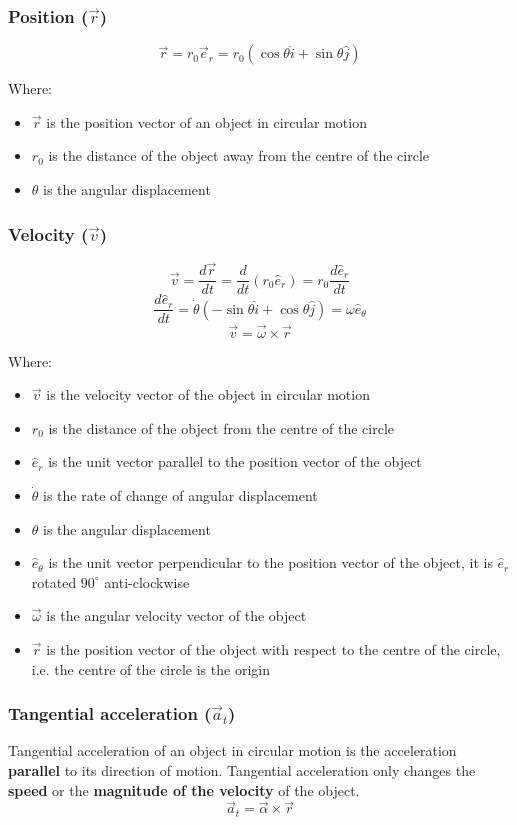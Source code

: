 \documentclass[11pt]{article}
\begin{document}
\subsubsection{Position (\(\vec{r}\))}
\label{sec:orge76ac7c}
\[\vec{r} = r_0 \vec{e}_r = r_0 (\cos \theta \hat{i} + \sin \theta \hat{j})\]

Where:
\begin{itemize}
\item \(\vec{r}\) is the position vector of an object in circular motion
\item \(r_0\) is the distance of the object away from the centre of the circle
\item \(\theta\) is the angular displacement
\end{itemize}

 \newpage

\subsubsection{Velocity (\(\vec{v}\))}
\label{sec:orga4d2a3d}
\[\vec{v} = \frac{d \vec{r}}{dt} = \frac{d}{dt} (r_0 \hat{e}_r) = r_0 \frac{d \hat{e}_r}{dt}\]
\[\frac{d \hat{e}_r}{dt} = \dot{\theta} (- \sin \theta \hat{i} + \cos \theta \hat{j}) = \omega \hat{e}_{\theta}\]
\[\vec{v} = \vec{\omega} \times \vec{r}\]

Where:
\begin{itemize}
\item \(\vec{v}\) is the velocity vector of the object in circular motion
\item \(r_0\) is the distance of the object from the centre of the circle
\item \(\hat{e}_r\) is the unit vector parallel to the position vector of the object
\item \(\dot{\theta}\) is the rate of change of angular displacement
\item \(\theta\) is the angular displacement
\item \(\hat{e}_{\theta}\) is the unit vector perpendicular to the position vector of the object, it is \(\hat{e}_r\) rotated \(90^{\circ}\) anti-clockwise
\item \(\vec{\omega}\) is the angular velocity vector of the object
\item \(\vec{r}\) is the position vector of the object with respect to the centre of the circle, i.e. the centre of the circle is the origin
\end{itemize}

\subsubsection{Tangential acceleration (\(\vec{a}_t\))}
\label{sec:orgebc62dc}
Tangential acceleration of an object in circular motion is the acceleration \textbf{parallel} to its direction of motion. Tangential acceleration only changes the \textbf{speed} or the \textbf{magnitude of the velocity} of the object.
\[\vec{a}_t = \vec{\alpha} \times \vec{r}\]
\end{document}
